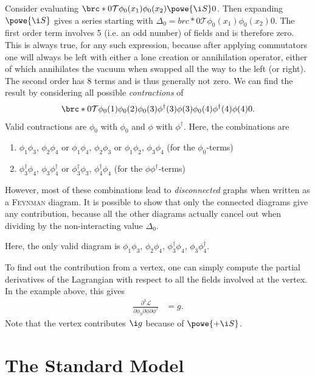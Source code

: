 \documentclass[english, parskip=full]{scrbook}
\newcommand{\definition}[2]{\begin{tcolorbox}[colback=colorbackgrounddefinition,colframe=colordefinition, breakable,enhanced,title=\textbf{#1}.]#2\end{tcolorbox}}
\newcommand{\example}[3]{\begin{tcolorbox}[colback=colorbackgroundexample,colframe=colorexample, breakable,enhanced,title={\textbf{#1}: #2.}]#3\end{tcolorbox}}
\begin{document}
\example{Contractions}{for $\mathcal{L} = g\phi_0\phi^\dagger\phi$}{
Consider evaluating $\brc*{0}{\mathcal{T}\phi_0(x_1)\phi_0(x_2)\powe{\i S}}{0}$.
Then expanding $\powe{\i S}$ gives a series starting with $\Delta_0=brc*{0}{\mathcal{T}\phi_0(x_1)\phi_0(x_2)}{0}$.
The first order term involves 5 (i.e. an odd number) of fields and is therefore zero.
This is always true, for any such expression, because after applying commutators one will always be left with either a lone creation or annihilation operator, either of which annihilates the vacuum when swapped all the way to the left (or right).
The second order has 8 terms and is thus generally not zero.
We can find the result by considering all possible \emph{contractions} of
\begin{align}
\brc*{0}{\mathcal{T}\phi_0(1)\phi_0(2)\phi_0(3)\phi^\dagger(3)\phi(3) \phi_0(4)\phi^\dagger(4)\phi(4) }{0}.
\end{align}
Valid contractions are $\phi_0$ with $\phi_0$ and $\phi$ with $\phi^\dagger$.
Here, the combinations are
\begin{enumerate}
\item $\phi_1\phi_3$, $\phi_2\phi_4$ or $\phi_1\phi_4$, $\phi_2\phi_3$ or $\phi_1\phi_2$, $\phi_3\phi_4$ (for the $\phi_0$-terms)
\item $\phi_3^\dagger\phi_4$, $\phi_3\phi_4^\dagger$ or $\phi_3^\dagger\phi_3$, $\phi_4^\dagger\phi_4$ (for the $\phi\phi^\dagger$-terms)
\end{enumerate}
However, most of these combinations lead to \emph{disconnected} graphs when written as a \textsc{Feynman} diagram.
It is possible to show that only the connected diagrams give any contribution, because all the other diagrams actually cancel out when dividing by the non-interacting value $\Delta_0$.

Here, the only valid diagram is $\phi_1\phi_3$, $\phi_2\phi_4$, $\phi_3^\dagger\phi_4$, $\phi_3\phi_4^\dagger$.
\definition{Vertex Rule}{
To find out the contribution from a vertex, one can simply compute the partial derivatives of the Lagrangian with respect to all the fields involved at the vertex.
In the example above, this gives
\begin{align}
\frac{\partial^3\mathcal{L}}{\partial\phi_0\partial \phi\partial\phi^\dagger} &= g.
\end{align}
Note that the vertex contributes $\i g$ because of $\powe{+\i S}$.
}
}
\chapter{The Standard Model}
\end{document}
